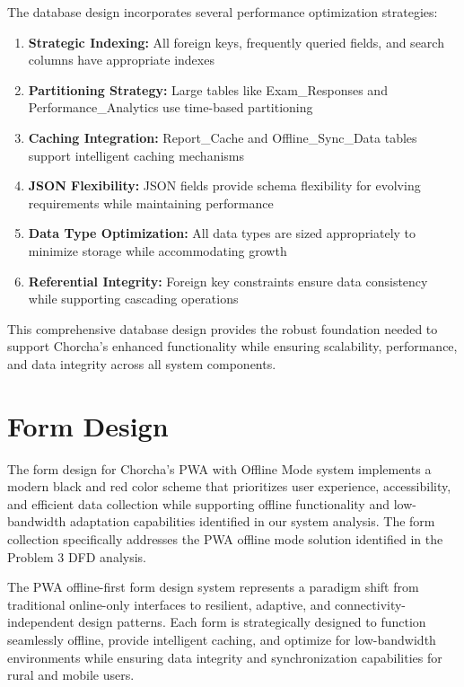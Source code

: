 \documentclass[12pt,a4paper,oneside]{book}
\begin{document}
The database design incorporates several performance optimization strategies:

\begin{enumerate}
    \item \textbf{Strategic Indexing:} All foreign keys, frequently queried fields, and search columns have appropriate indexes
    \item \textbf{Partitioning Strategy:} Large tables like Exam\_Responses and Performance\_Analytics use time-based partitioning
    \item \textbf{Caching Integration:} Report\_Cache and Offline\_Sync\_Data tables support intelligent caching mechanisms
    \item \textbf{JSON Flexibility:} JSON fields provide schema flexibility for evolving requirements while maintaining performance
    \item \textbf{Data Type Optimization:} All data types are sized appropriately to minimize storage while accommodating growth
    \item \textbf{Referential Integrity:} Foreign key constraints ensure data consistency while supporting cascading operations
\end{enumerate}

This comprehensive database design provides the robust foundation needed to support Chorcha's enhanced functionality while ensuring scalability, performance, and data integrity across all system components.

\section{Form Design}

The form design for Chorcha's PWA with Offline Mode system implements a modern black and red color scheme that prioritizes user experience, accessibility, and efficient data collection while supporting offline functionality and low-bandwidth adaptation capabilities identified in our system analysis. The form collection specifically addresses the PWA offline mode solution identified in the Problem 3 DFD analysis.

\begin{tcolorbox}[infobox, title=PWA Offline-First Form Design Philosophy]
The PWA offline-first form design system represents a paradigm shift from traditional online-only interfaces to resilient, adaptive, and connectivity-independent design patterns. Each form is strategically designed to function seamlessly offline, provide intelligent caching, and optimize for low-bandwidth environments while ensuring data integrity and synchronization capabilities for rural and mobile users.
\end{tcolorbox}
\end{document}
